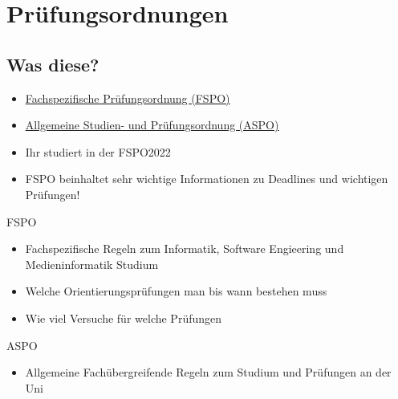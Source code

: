 \documentclass[
	aspectratio=169, 
	8pt 
]{beamer}
\begin{document}
\section{Prüfungsordnungen}
\subsection{Was diese?}
\begin{frame}{\insertsubsection}
    \begin{itemize}
        \item \underline{\href{https://www.uni-ulm.de/fileadmin/website_uni_ulm/zuv/zuv.dezIII.abt2u3/3-2oeffentlich/bekanntmachungen/2022/FSPO_Informatikstudiengaenge.pdf}{Fachspezifische Prüfungsordnung (FSPO)}}
        \item \underline{\href{https://www.uni-ulm.de/fileadmin/website_uni_ulm/zuv/zuv.dezIII.abt2u3/3-2oeffentlich/bekanntmachungen/2022/veroeffentlichung_asop_final.pdf}{Allgemeine Studien- und Prüfungsordnung (ASPO)}}
        \item Ihr studiert in der FSPO2022
        \item FSPO beinhaltet sehr wichtige Informationen zu Deadlines und wichtigen Prüfungen! 
    \end{itemize}
\end{frame}


\begin{frame}
    \begin{fancycolumns}
        \begin{definition}{FSPO}
            \begin{itemize}
                \item Fachspezifische Regeln zum Informatik, Software Engieering und Medieninformatik Studium
                \item Welche Orientierungsprüfungen man bis wann bestehen muss
                \item Wie viel Versuche für welche Prüfungen 
            \end{itemize}
        \end{definition}

        \nextcolumn
        
        \begin{definition}{ASPO}
            \begin{itemize}
                \item Allgemeine Fachübergreifende Regeln zum Studium und Prüfungen an der Uni
            \end{itemize}
        \end{definition}
            
    \end{fancycolumns}
\end{frame}
\end{document}
